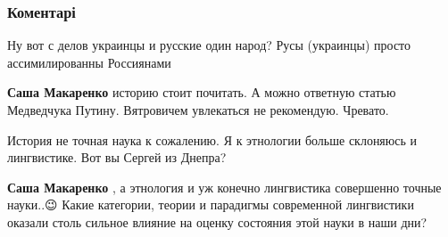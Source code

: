  
 
 
 
 
\subsubsection{Коментарі}

\begin{itemize}
 
Ну вот с делов украинцы и русские один народ? Русы (украинцы) просто ассимилированны Россиянами

\begin{itemize}
 
\textbf{Саша Макаренко} историю стоит почитать. А можно ответную статью Медведчука Путину.
Вятровичем увлекаться не рекомендую. Чревато.

 
История не точная наука к сожалению. Я к этнологии больше склоняюсь и лингвистике. Вот вы Сергей из Днепра?

 
\textbf{Саша Макаренко} , а этнология и уж конечно лингвистика совершенно точные науки..😉
Какие категории, теории и парадигмы современной лингвистики оказали столь сильное влияние на оценку состояния этой науки в наши дни?


\end{itemize}
\end{itemize}
